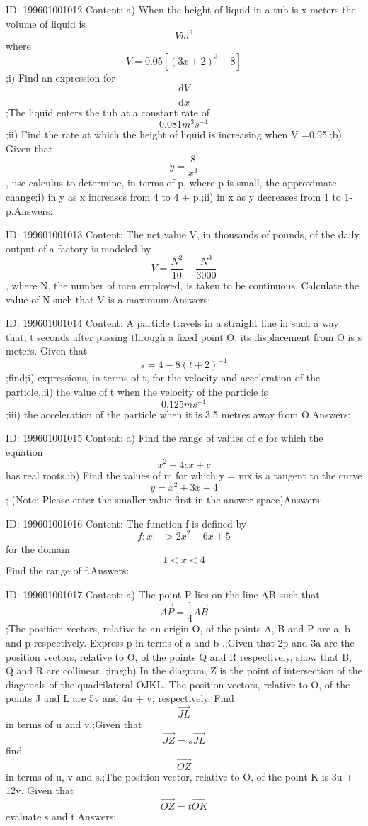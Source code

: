 \documentclass{article}
\begin{document}
ID: 199601001012
Content:
a) When the height of liquid in a tub is x meters the volume of liquid is  \[Vm^3\] where  \[V=0.05[(3x+2)^3-8]\] ;i) Find an expression for \[\frac{\mathrm{d} V}{\mathrm{d} x}\];The liquid enters the tub at a constant rate of \[0.081m^3s^{-1}\] ;ii)	Find the rate at which the height of liquid is increasing when V =0.95.;b) Given that \[y=\frac{8}{x^3}\], use calculus to determine, in terms of p, where p is small, the approximate change;i)	in y as x increases from 4 to 4 + p,;ii)	in x as y decreases from 1 to 1-p.Answers:

ID: 199601001013
Content:
The net value V, in thousands of pounds, of the daily output of a factory is modeled by \[V = \frac{N^2}{10}- \frac{N^3}{3000}\], where N, the number of men employed, is taken to be continuous. Calculate the value of N such that V is a maximum.Answers:

ID: 199601001014
Content:
A particle travels in a straight line in such a way that, t seconds after passing through a fixed point O, its displacement from O is s meters. Given that \[s=4-8(t+2)^{-1}\];find;i)	expressions, in terms of t, for the velocity and acceleration of the particle,;ii)	the value of t when the velocity of the particle is \[0.125m s^{-1}\];iii)	the acceleration of the particle when it is 3.5 metres away from O.Answers:

ID: 199601001015
Content:
a) Find the range of values of c for which the equation \[x^2-4cx+c\] has real roots.;b) Find the values of m for which y = mx is a tangent to the curve \[y = x^2+3x+4\]; (Note: Please enter the smaller value first in the answer space)Answers:

ID: 199601001016
Content:
The function f is defined by \[f:x |-> 2x^2-6x+5\] for the domain \[1< x< 4\] Find the range of f.Answers:

ID: 199601001017
Content:
a) The point P lies on the line AB such that \[\vec{AP}=\frac{1}{4}\vec{AB}\] ;The position vectors, relative to an origin O, of the points A, B and P are a, b and p respectively. Express p in terms of a and b .;Given that 2p and 3a are the position vectors, relative to O, of the points Q and R respectively, show that B, Q and R are collinear. ;img;b) In the diagram, Z is the point of intersection of the diagonals of the quadrilateral OJKL. The position vectors, relative to O, of the points J and L are 5v and 4u + v, respectively. Find \[\vec{JL}\] in terms of u and v.;Given that \[\vec{JZ} = s\vec{JL}\] find \[\vec{OZ}\] in terms of u, v and s.;The position vector, relative to O, of the point K is 3u + 12v. Given that \[\vec{OZ} = t\vec{OK}\]  evaluate s and t.Answers:
\end{document}

